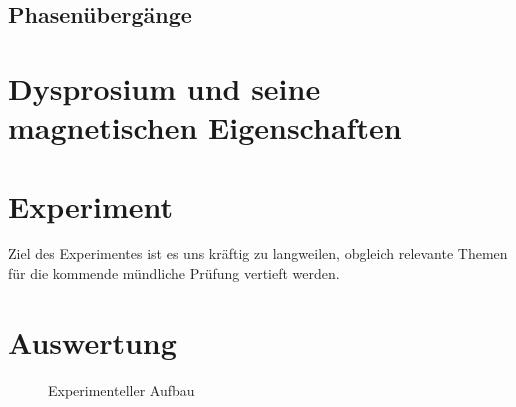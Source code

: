 \documentclass{include/thesisclass3}
\begin{document}
\section{Phasenübergänge}


\chapter{Dysprosium und seine magnetischen Eigenschaften}
\chapter{Experiment}
Ziel des Experimentes ist es uns kräftig zu langweilen, obgleich relevante Themen für die kommende mündliche Prüfung vertieft werden.
\chapter{Auswertung}


\begin{figure}[ht]
	\begin{center}
		\caption{Experimenteller Aufbau}
		\label{aufbau}
	\end{center}
\end{figure}
\end{document}
